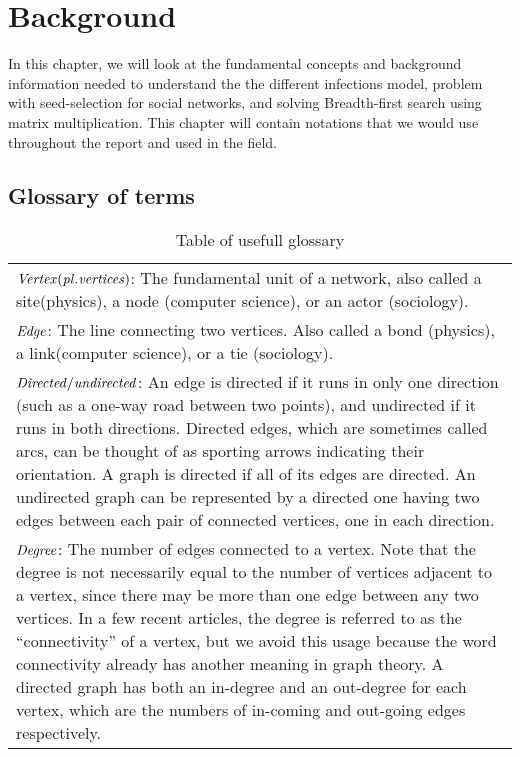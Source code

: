 \chapter{Background}

In this chapter, we will look at the fundamental concepts and background information needed to understand the the different infections model, problem with seed-selection for social networks, and solving Breadth-first search using matrix multiplication. This chapter will contain notations that we would use throughout the report and used in the field. 

\section{Glossary of terms}

\begin{table}
	\caption{Table of usefull glossary}
    \begin{tabularx}{\textwidth}{|X|}

    \hline
    	
    	$\it{{Vertex}} (pl. vertices)$: The fundamental unit of a network, also called a site(physics), a node (computer science), or an actor 	(sociology).
    	
    	\\

		$\it{{Edge}}$: The line connecting two vertices. Also called a bond (physics), a link(computer science), or a tie (sociology).
		
		\\

		$\it{{Directed/undirected}}$: An edge is directed if it runs in only one direction (such as a one-way road between two points), and undirected if it runs in both directions. Directed edges, which are sometimes called arcs, can be thought of as sporting arrows indicating their orientation. A graph is directed if all of its edges are directed. An undirected graph can be represented by a directed one having two edges between each pair of connected vertices, one in each direction.
	
		\\

		$\it{{Degree}}$: The number of edges connected to a vertex. Note that the degree is not necessarily equal to the number of vertices adjacent to a vertex, since there may be more than one edge between any two vertices. In a few recent articles, the degree is referred to as the “connectivity” of a vertex, but we avoid this usage because the word connectivity already has another meaning in graph theory. A directed graph has both an in-degree and an out-degree for each vertex, which are the numbers of in-coming and out-going edges respectively.
	

\end{tabularx}
\end{table}
